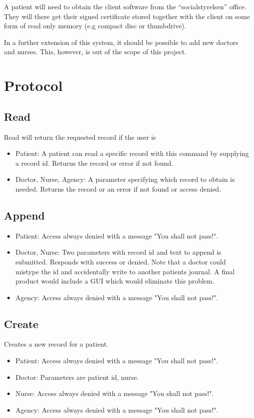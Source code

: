 \documentclass[10pt, a4paper]{article}
\begin{document}
A patient will need to obtain the client software from the ``socialstyrelsen'' office. They will there get their signed certificate stored together with the client on some form of read only memory (e.g compact disc or thumbdrive).

In a further extension of this system, it should be possible to add new doctors and nurses. This, however, is out of the scope of this project.


\section{Protocol}
\subsection{Read}
Read will return the requested record if the user is 
\begin{itemize}
	\item Patient: A patient can read a specific record with this command by supplying a record id. Returns the record or error if not found.
	\item Doctor, Nurse, Agency: A parameter specifying which record to obtain is needed. Returns the record or an error if not found or access denied.
\end{itemize}

\subsection{Append}
\begin{itemize}
\item Patient: Access always denied with a message "You shall not pass!".
\item Doctor, Nurse: Two parameters with record id and text to append is submitted. Responds with success or denied. Note that a doctor could mistype the id and accidentally write to another patients journal. A final product would include a GUI which would eliminate this problem.
\item Agency: Access always denied with a message "You shall not pass!".
\end{itemize}

\subsection{Create}
Creates a new record for a patient.
\begin{itemize}
\item Patient: Access always denied with a message "You shall not pass!".
\item Doctor: Parameters are patient id, nurse.
\item Nurse: Access always denied with a message "You shall not pass!".
\item Agency: Access always denied with a message "You shall not pass!".
\end{itemize}
\end{document}
